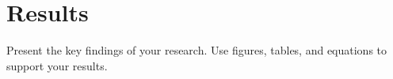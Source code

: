\chapter{Results}
\label{ch:results}
Present the key findings of your research. Use figures, tables, and equations to support your results.
